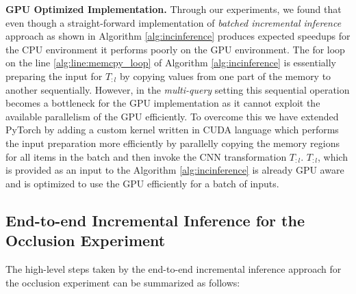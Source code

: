 \vspace{2mm}
\noindent \textbf{GPU Optimized Implementation.}
Through our experiments, we found that even though a straight-forward implementation of \textit{batched incremental inference} approach as shown in Algorithm \ref{alg:incinference} produces expected speedups for the CPU environment it performs poorly on the GPU environment.
The for loop on the line \ref{alg:line:memcpy_loop} of Algorithm \ref{alg:incinference} is essentially preparing the input for $T_{:l}$ by copying values from one part of the memory to another sequentially.
However, in the \textit{multi-query} setting this sequential operation becomes a bottleneck for the GPU implementation as it cannot exploit the available parallelism of the GPU efficiently.
To overcome this we have extended PyTorch by adding a custom kernel written in CUDA language which performs the input preparation more efficiently by parallelly copying the memory regions for all items in the batch and then invoke the CNN transformation $T_{:l}$.
$T_{:l}$, which is provided as an input to the Algorithm \ref{alg:incinference} is already GPU aware and is optimized to use the GPU efficiently for a batch of inputs.


\subsection{End-to-end Incremental Inference for the Occlusion Experiment}

The high-level steps taken by the end-to-end incremental inference approach for the occlusion experiment can be summarized as follows:

